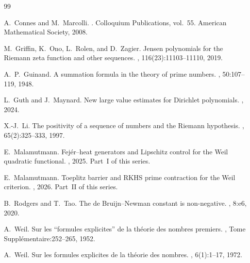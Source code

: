 \documentclass[11pt,a4paper]{article}
\theoremstyle{definition}
\begin{document}
\begin{thebibliography}{99}

A.~Connes and M.~Marcolli.
.
\newblock Colloquium Publications, vol.~55. American Mathematical Society, 2008.

M.~Griffin, K.~Ono, L.~Rolen, and D.~Zagier.
\newblock Jensen polynomials for the {R}iemann zeta function and other sequences.
, 116(23):11103--11110, 2019.

A.~P.~Guinand.
\newblock A summation formula in the theory of prime numbers.
, 50:107--119, 1948.

L.~Guth and J.~Maynard.
\newblock New large value estimates for {D}irichlet polynomials.
, 2024.

X.-J.~Li.
\newblock The positivity of a sequence of numbers and the {R}iemann hypothesis.
, 65(2):325--333, 1997.

E.~Malamutmann.
\newblock Fej\'er--heat generators and {L}ipschitz control for the {W}eil quadratic functional.
, 2025.
\newblock Part~I of this series.

E.~Malamutmann.
\newblock Toeplitz barrier and {RKHS} prime contraction for the {W}eil criterion.
, 2026.
\newblock Part~II of this series.

B.~Rodgers and T.~Tao.
\newblock The de {B}ruijn--{N}ewman constant is non-negative.
, 8:e6, 2020.

A.~Weil.
\newblock Sur les ``formules explicites'' de la th\'eorie des nombres premiers.
, Tome Suppl\'ementaire:252--265, 1952.

A.~Weil.
\newblock Sur les formules explicites de la th\'eorie des nombres.
, 6(1):1--17, 1972.

\end{thebibliography}
\end{document}
